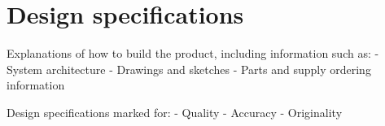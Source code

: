 \section{Design specifications}
Explanations of how to build the product, including information such as:
- System architecture
- Drawings and sketches
- Parts and supply ordering information

Design specifications marked for:
- Quality
- Accuracy
- Originality
